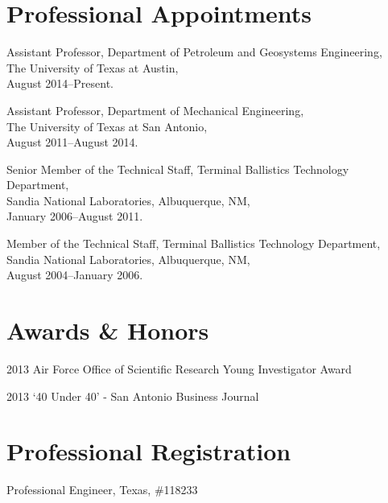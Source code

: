 \documentclass[12pt,letterpaper]{article}
\renewenvironment{itemize}{
  \begin{list}{}{
    \setlength{\leftmargin}{1.5em}
    \setlength{\itemsep}{0.25em}
    \setlength{\parskip}{0pt}
    \setlength{\parsep}{0.25em}
  }
}{
  \end{list}
}
\begin{document}
\section*{Professional Appointments}

\begin{itemize}
    \item Assistant Professor, Department of Petroleum and Geosystems Engineering, \\ 
          The University of Texas at Austin, \\
          August 2014--Present. 

    \item Assistant Professor, Department of Mechanical Engineering, \\ 
          The University of Texas at San Antonio,\\
          August 2011--August 2014. 

    \item Senior Member of the Technical Staff, Terminal Ballistics Technology Department, \\ 
          Sandia National Laboratories, Albuquerque, NM, \\ 
          January 2006--August 2011.

    \item Member of the Technical Staff, Terminal Ballistics Technology Department, \\ 
          Sandia National Laboratories, Albuquerque, NM, \\ 
          August 2004--January 2006.
\end{itemize}

\section*{Awards \& Honors}

\begin{itemize}
    \item 2013 Air Force Office of Scientific Research Young Investigator Award

    \item 2013 `40 Under 40' - San Antonio Business Journal
\end{itemize}


\section*{Professional Registration}

\begin{itemize}
    \item Professional Engineer, Texas, \#118233
\end{itemize}
\end{document}
